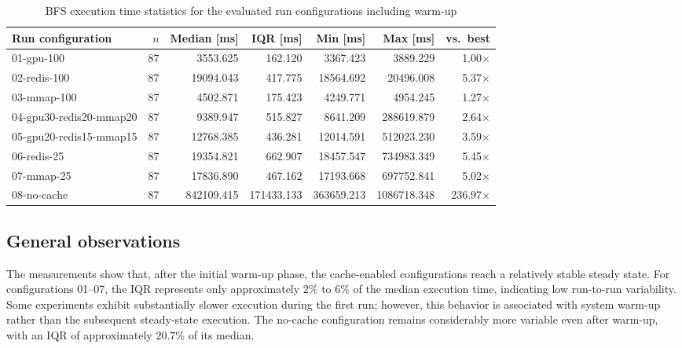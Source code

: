 \documentclass[11pt,a4paper]{article}
\begin{document}
\begin{table}[H]
    \centering
    \caption{BFS execution time statistics for the evaluated run configurations including warm-up}
    \label{tab:bfs-run-configurations}

    \begin{tabular}{lrrrrrr}
        \hline
        \textbf{Run configuration} &
        \textbf{$n$} &
        \textbf{Median [ms]} &
        \textbf{IQR [ms]} &
        \textbf{Min [ms]} &
        \textbf{Max [ms]} &
        \textbf{vs.\ best} \\
        \hline
        01-gpu-100              & 87 & 3553.625   & 162.120    & 3367.423   & 3889.229    & 1.00$\times$   \\
        02-redis-100            & 87 & 19094.043  & 417.775    & 18564.692  & 20496.008   & 5.37$\times$   \\
        03-mmap-100             & 87 & 4502.871   & 175.423    & 4249.771   & 4954.245    & 1.27$\times$   \\
        04-gpu30-redis20-mmap20 & 87 & 9389.947   & 515.827    & 8641.209   & 288619.879  & 2.64$\times$   \\
        05-gpu20-redis15-mmap15 & 87 & 12768.385  & 436.281    & 12014.591  & 512023.230  & 3.59$\times$   \\
        06-redis-25             & 87 & 19354.821  & 662.907    & 18457.547  & 734983.349  & 5.45$\times$   \\
        07-mmap-25              & 87 & 17836.890  & 467.162    & 17193.668  & 697752.841  & 5.02$\times$   \\
        08-no-cache             & 87 & 842109.415 & 171433.133 & 363659.213 & 1086718.348 & 236.97$\times$ \\
        \hline
    \end{tabular}
\end{table}

\subsection{General observations}

The measurements show that, after the initial warm-up phase, the cache-enabled configurations reach a relatively stable steady state. For configurations 01--07, the IQR represents only approximately \(2\%\) to \(6\%\) of the median execution time, indicating low run-to-run variability. Some experiments exhibit substantially slower execution during the first run; however, this behavior is associated with system warm-up rather than the subsequent steady-state execution. The no-cache configuration remains considerably more variable even after warm-up, with an IQR of approximately \(20.7\%\) of its median.
\end{document}
